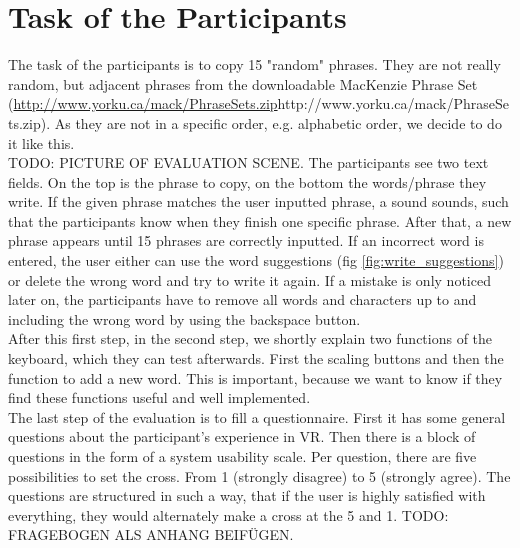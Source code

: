 \section{Task of the Participants}
The task of the participants is to copy 15 "random" phrases. They are not really random, but adjacent phrases from the downloadable MacKenzie Phrase Set (\url{http://www.yorku.ca/mack/PhraseSets.zip}{http://www.yorku.ca/mack/PhraseSets.zip}). As they are not in a specific order, e.g. alphabetic order, we decide to do it like this.\\
TODO: PICTURE OF EVALUATION SCENE.
The participants see two text fields. On the top is the phrase to copy, on the bottom the words/phrase they write. If the given phrase matches the user inputted phrase, a sound sounds, such that the participants know when they finish one specific phrase. After that, a new phrase appears until 15 phrases are correctly inputted. If an incorrect word is entered, the user either can use the word suggestions (fig \ref{fig:write_suggestions}) or delete the wrong word and try to write it again. If a mistake is only noticed later on, the participants have to remove all words and characters up to and including the wrong word by using the backspace button.\\
After this first step, in the second step, we shortly explain two functions of the keyboard, which they can test afterwards. First the scaling buttons and then the function to add a new word. This is important, because we want to know if they find these functions useful and well implemented.\\
The last step of the evaluation is to fill a questionnaire. First it has some general questions about the participant's experience in VR. Then there is a block of questions in the form of a system usability scale. Per question, there are five possibilities to set the cross. From 1 (strongly disagree) to 5 (strongly agree). The questions are structured in such a way, that if the user is highly satisfied with everything, they would alternately make a cross at the 5 and 1. TODO: FRAGEBOGEN ALS ANHANG BEIFÜGEN.

